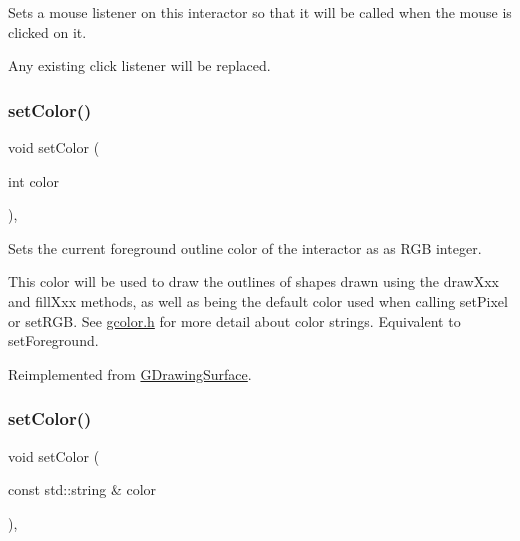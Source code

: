 Sets a mouse listener on this interactor so that it will be called when the mouse is clicked on it. 

Any existing click listener will be replaced. \mbox{\label{classsgl_1_1GCanvas_af6e1bcf23a09a0ae0607daff81ee45fa}} 
\subsubsection{\texorpdfstring{set\+Color()}{setColor()}\hspace{0.1cm}{\footnotesize\ttfamily [1/2]}}
{\footnotesize\ttfamily void set\+Color (\begin{DoxyParamCaption}\item[{int}]{color }\end{DoxyParamCaption})\hspace{0.3cm}{\ttfamily [override]}, {\ttfamily [virtual]}}



Sets the current foreground outline color of the interactor as as R\+GB integer. 

This color will be used to draw the outlines of shapes drawn using the draw\+Xxx and fill\+Xxx methods, as well as being the default color used when calling set\+Pixel or set\+R\+GB. See \mbox{\hyperlink{gcolor_8h_source}{gcolor.\+h}} for more detail about color strings. Equivalent to set\+Foreground. 

Reimplemented from \mbox{\hyperlink{classsgl_1_1GDrawingSurface_a75b9cb32ff80bf061791beb01a8433d0}{G\+Drawing\+Surface}}.

\mbox{\label{classsgl_1_1GCanvas_a56845b1accc47aa881d05939eef6996c}} 
\subsubsection{\texorpdfstring{set\+Color()}{setColor()}\hspace{0.1cm}{\footnotesize\ttfamily [2/2]}}
{\footnotesize\ttfamily void set\+Color (\begin{DoxyParamCaption}\item[{const std\+::string \&}]{color }\end{DoxyParamCaption})\hspace{0.3cm}{\ttfamily [override]}, {\ttfamily [virtual]}}



